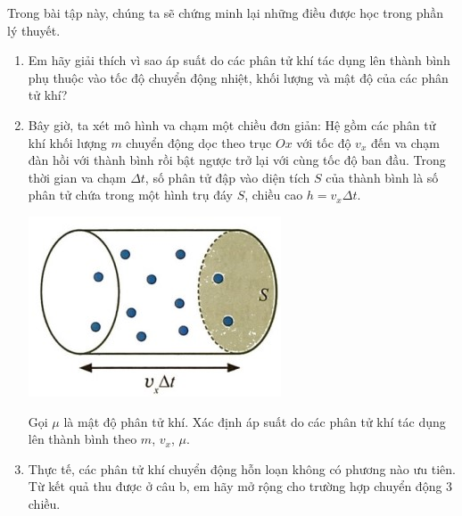 \begin{vd}
	Trong bài tập này, chúng ta sẽ chứng minh lại những điều được học trong phần lý thuyết.
		\begin{enumerate}[label=\alph*)]
			\item Em hãy giải thích vì sao áp suất do các phân tử khí tác dụng lên thành bình phụ thuộc vào tốc độ chuyển động nhiệt, khối lượng và mật độ của các phân tử khí?
			\item Bây giờ, ta xét mô hình va chạm một chiều đơn giản: Hệ gồm các phân tử khí khối lượng $m$ chuyển động dọc theo trục $Ox$ với tốc độ $v_x$ đến va chạm đàn hồi với thành bình rồi bật ngược trở lại với cùng tốc độ ban đầu. Trong thời gian va chạm $\Delta t$, số phân tử đập vào diện tích $S$ của thành bình là số phân tử chứa trong một hình trụ đáy $S$, chiều cao $h=v_x\Delta t$. 
			\begin{center}
				\includegraphics[width=0.3\linewidth]{figs/VN12-Y24-PH-SYL-014-1}
			\end{center}
			Gọi $\mu$ là mật độ phân tử khí. Xác định áp suất do các phân tử khí tác dụng lên thành bình theo $m$, $v_x$, $\mu$.
			\item Thực tế, các phân tử khí chuyển động hỗn loạn không có phương nào ưu tiên. Từ kết quả thu được ở câu b, em hãy mở rộng cho trường hợp chuyển động 3 chiều.
		\end{enumerate}
\end{vd}
